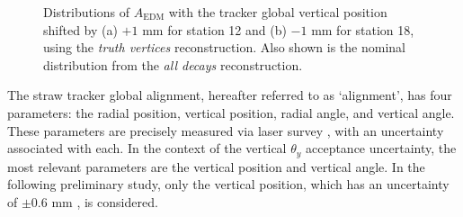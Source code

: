\begin{figure}[b!]
\centering{}
\caption{Distributions of $A_{\text{EDM}}$ with the tracker global vertical position shifted by (a) $+1$ mm for station 12 and (b) $-1$ mm for station 18, using the \textit{truth vertices} reconstruction. Also shown is the nominal distribution from the \textit{all decays} reconstruction.} 
\label{fig:AEDMWithAlignment}
\end{figure}   

The straw tracker global alignment, hereafter referred to as `alignment', has four parameters: the radial position, vertical position, radial angle, and vertical angle. These parameters are precisely measured via laser survey \cite{Lukicov}, with an uncertainty associated with each. In the context of the vertical $\theta_{y}$ acceptance uncertainty, the most relevant parameters are the vertical position and vertical angle. In the following preliminary study, only the vertical position, which has an uncertainty of $\pm0.6$ mm \cite{VerticalGlobalAlignment}, is considered. 

